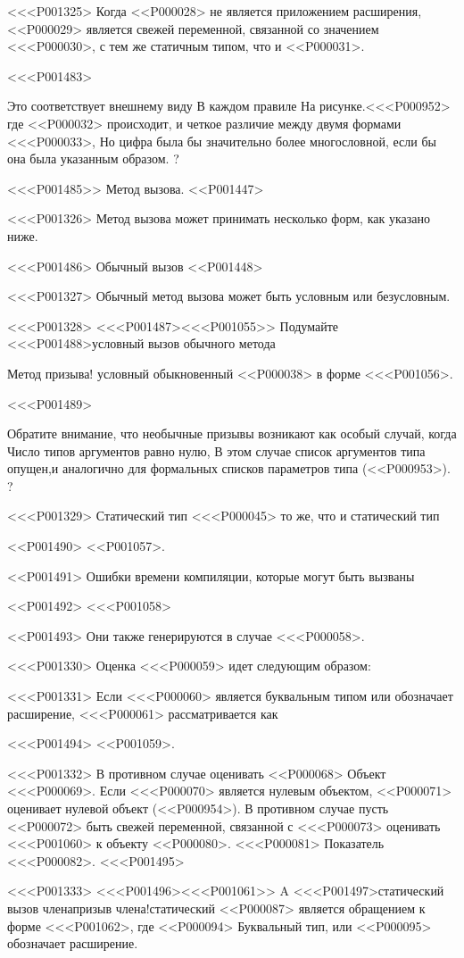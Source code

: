 {{{<<<P001325>%
Когда <<P000028> не является приложением расширения,
<<P000029> является свежей переменной, связанной со значением <<<P000030>,
с тем же статичным типом, что и <<P000031>.

<<<P001483>{%
Это соответствует внешнему виду \LET{} В каждом правиле
На рисунке.<<<P000952>
где <<P000032> происходит,
и четкое различие между двумя формами <<<P000033>,
Но цифра была бы значительно более многословной, если бы она была
указанным образом.%
?


<<<P001485>> Метод вызова.
<<P001447>

<<<P001326>%
Метод вызова может принимать несколько форм, как указано ниже.


<<<P001486> Обычный вызов
<<P001448>

<<<P001327>%
Обычный метод вызова может быть условным или безусловным.

<<<P001328>%
<<<P001487><<<P001055>>
Подумайте
<<<P001488>{условный вызов обычного метода}{%
Метод призыва! условный обыкновенный
<<P000038> в форме
<<<P001056>.

<<<P001489>{%
Обратите внимание, что необычные призывы возникают как особый случай, когда
Число типов аргументов равно нулю,
В этом случае список аргументов типа опущен,и аналогично для формальных списков параметров типа (<<P000953>).%
?

<<<P001329>%
Статический тип <<<P000045> то же, что и статический тип

<<P001490>
<<P001057>.

<<P001491>
Ошибки времени компиляции, которые могут быть вызваны

<<P001492>
<<<P001058>

<<P001493>
Они также генерируются в случае <<<P000058>.

<<<P001330>%
Оценка <<<P000059> идет следующим образом:

<<<P001331>%
Если <<<P000060> является буквальным типом или обозначает расширение, <<<P000061> рассматривается как

<<<P001494>
<<P001059>.

<<<P001332>%
В противном случае оценивать <<P000068> Объект <<<P000069>.
Если <<<P000070> является нулевым объектом, <<P000071> оценивает нулевой объект (<<P000954>).
В противном случае пусть <<P000072> быть свежей переменной, связанной с <<<P000073> оценивать
<<<P001060>
к объекту <<P000080>.
<<<P000081> Показатель <<<P000082>.
<<<P001495>

<<<P001333>%
<<<P001496><<<P001061>>
A <<<P001497>{статический вызов члена}{призыв члена!статический}
<<P000087> является обращением к форме
<<<P001062>,
где <<P000094> Буквальный тип, или <<P000095> обозначает расширение.

}}}}}}
